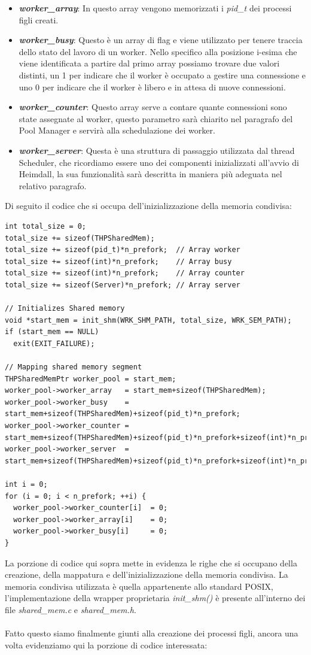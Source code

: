 \documentclass[italian]{tktltiki2}
\begin{document}
\begin{itemize}
  \item \textbf{\emph{worker\_array}}: In questo array vengono memorizzati i \emph{pid\_t} dei processi figli creati.          
  \item \textbf{\emph{worker\_busy}}: Questo è un array di flag e viene utilizzato per tenere traccia dello stato del lavoro di un worker. Nello specifico alla posizione i-esima che viene identificata a partire dal primo array possiamo trovare due valori distinti, un 1 per indicare che il worker è occupato a gestire una connessione e uno 0 per indicare che il worker è libero e in attesa di nuove connessioni.
  \item \textbf{\emph{worker\_counter}}: Questo array serve a contare quante connessioni sono state assegnate al worker, questo parametro sarà chiarito nel paragrafo del Pool Manager e servirà alla schedulazione dei worker.
  \item \textbf{\emph{worker\_server}}: Questa è una struttura di passaggio utilizzata dal thread Scheduler, che ricordiamo essere uno dei componenti inizializzati all'avvio di Heimdall, la sua funzionalità sarà descritta in maniera più adeguata nel relativo paragrafo.
\end{itemize}
Di seguito il codice che si occupa dell'inizializzazione della memoria condivisa:
\begin{lstlisting}
int total_size = 0;
total_size += sizeof(THPSharedMem);
total_size += sizeof(pid_t)*n_prefork;  // Array worker
total_size += sizeof(int)*n_prefork;    // Array busy
total_size += sizeof(int)*n_prefork;    // Array counter
total_size += sizeof(Server)*n_prefork; // Array server

// Initializes Shared memory
void *start_mem = init_shm(WRK_SHM_PATH, total_size, WRK_SEM_PATH);
if (start_mem == NULL)
  exit(EXIT_FAILURE);

// Mapping shared memory segment
THPSharedMemPtr worker_pool = start_mem;
worker_pool->worker_array   = start_mem+sizeof(THPSharedMem);
worker_pool->worker_busy    = start_mem+sizeof(THPSharedMem)+sizeof(pid_t)*n_prefork;
worker_pool->worker_counter = start_mem+sizeof(THPSharedMem)+sizeof(pid_t)*n_prefork+sizeof(int)*n_prefork;
worker_pool->worker_server  = start_mem+sizeof(THPSharedMem)+sizeof(pid_t)*n_prefork+sizeof(int)*n_prefork+sizeof(int)*n_prefork;

int i = 0;
for (i = 0; i < n_prefork; ++i) {
  worker_pool->worker_counter[i]  = 0;
  worker_pool->worker_array[i]    = 0;
  worker_pool->worker_busy[i]     = 0;
}
\end{lstlisting}
La porzione di codice qui sopra mette in evidenza le righe che si occupano della creazione, della mappatura e dell'inizializzazione della memoria condivisa. La memoria condivisa utilizzata è quella appartenente allo standard POSIX, l'implementazione della wrapper proprietaria \emph{init\_shm()} è presente all'interno dei file \emph{shared\_mem.c} e \emph{shared\_mem.h}.
\\
\\
Fatto questo siamo finalmente giunti alla creazione dei processi figli, ancora una volta evidenziamo qui la porzione di codice interessata:
\end{document}
